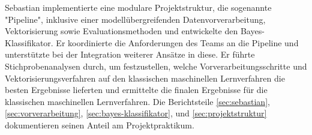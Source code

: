 \label{sec:sebastian}
Sebastian implementierte eine modulare Projektstruktur, die sogenannte "Pipeline", inklusive einer modellübergreifenden Datenvorverarbeitung, Vektorisierung sowie Evaluationsmethoden und entwickelte den Bayes-Klassifikator. Er koordinierte die Anforderungen des Teams an die Pipeline und unterstützte bei der Integration weiterer Ansätze in diese. Er führte Stichprobenanalysen durch, um festzustellen, welche Vorverarbeitungsschritte und Vektorisierungsverfahren auf den klassischen maschinellen Lernverfahren die besten Ergebnisse lieferten und ermittelte die finalen Ergebnisse für die klassischen maschinellen Lernverfahren. Die Berichtsteile \ref{sec:sebastian}, \ref{sec:vorverarbeitung}, \ref{sec:bayes-klassifikator}, und \ref{sec:projektstruktur} dokumentieren seinen Anteil am Projektpraktikum.
